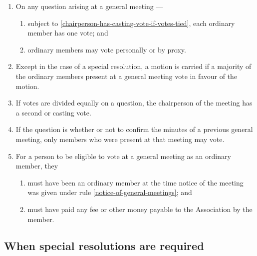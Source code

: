 \documentclass[../constitution.tex]{subfiles}
\begin{document}
\begin{enumerate}

\item On any question arising at a general meeting ---


  \begin{enumerate}
  
  \item subject to  \ref{chairperson-has-casting-vote-if-votes-tied}, each ordinary member has one vote; and
  \item ordinary members may vote personally or by proxy.
  \end{enumerate}
\item Except in the case of a special resolution, a motion is carried if a majority of the ordinary members present at a general meeting vote in favour of the motion.
\item If votes are divided equally on a question, the chairperson of the meeting has a second or casting vote. \label{chairperson-has-casting-vote-if-votes-tied}
\item If the question is whether or not to confirm the minutes of a previous general meeting, only members who were present at that meeting may vote.
\item For a person to be eligible to vote at a general meeting as an ordinary member, they

  \begin{enumerate}
  
  \item must have been an ordinary member at the time notice of the meeting was given under rule \ref{notice-of-general-meetings}; and
  \item must have paid any fee or other money payable to the Association by the member. 
  \end{enumerate}
\end{enumerate}

\hypertarget{when-special-resolutions-are-required}{%
\subsection{When special resolutions are required}\label{when-special-resolutions-are-required}}
\end{document}

